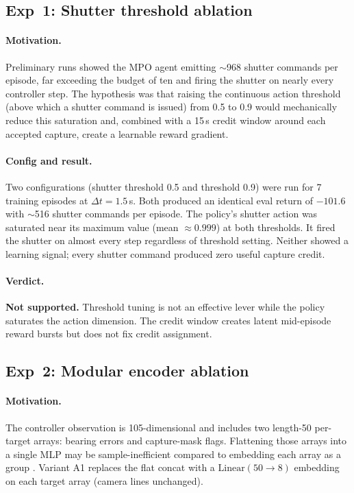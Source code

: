 \subsection{Exp~1: Shutter threshold ablation}
\label{sec:exp1}

\paragraph{Motivation.}
Preliminary runs showed the MPO agent emitting $\sim$968 shutter commands per episode, far exceeding the budget of ten and firing the shutter on nearly every controller step.
The hypothesis was that raising the continuous action threshold (above which a shutter command is issued) from 0.5 to 0.9 would mechanically reduce this saturation
and, combined with a 15\,s credit window around each accepted capture, create a learnable reward gradient.

\paragraph{Config and result.}
Two configurations (shutter threshold 0.5 and threshold 0.9) were run for 7 training episodes at $\Delta t=1.5$\,s.
Both produced an identical eval return of $-101.6$ with $\sim$516 shutter commands per episode.
The policy's shutter action was saturated near its maximum value (mean $\approx 0.999$) at both thresholds.
It fired the shutter on almost every step regardless of threshold setting.
Neither showed a learning signal; every shutter command produced zero useful capture credit.

\paragraph{Verdict.}
\textbf{Not supported.}
Threshold tuning is not an effective lever while the policy saturates the action dimension.
The credit window creates latent mid-episode reward bursts but does not fix credit assignment.

\subsection{Exp~2: Modular encoder ablation}
\label{sec:exp2}

\paragraph{Motivation.}
The controller observation is 105-dimensional and includes two length-50 per-target arrays: bearing errors and capture-mask flags.
Flattening those arrays into a single MLP may be sample-inefficient compared to embedding each array as a group
\citep{gorishniy2022revisiting}.
Variant A1 replaces the flat concat with a $\mathrm{Linear}(50 \to 8)$ embedding on each target array (camera lines unchanged).

